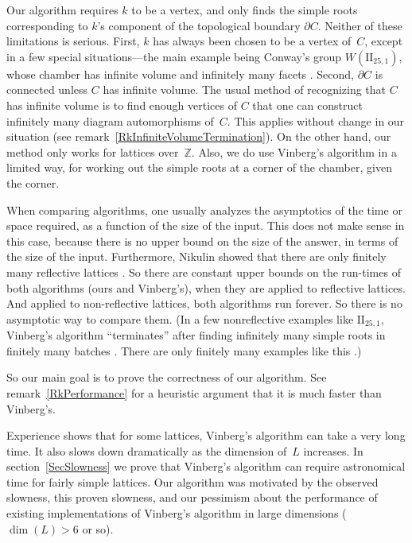 \documentclass[12pt]{amsart}
\def\II{\mathrm{II}}
\def\Z{\mathbb{Z}}
\numberwithin{theorem}{section}
\numberwithin{equation}{section}
\numberwithin{figure}{section}
\theoremstyle{remark}
\begin{document}
Our algorithm requires $k$ to be
a vertex,
and only finds the simple roots corresponding to
$k$'s component of the topological boundary $\partial C$.  
Neither of these limitations is serious.
First, 
$k$ has always been chosen to be a vertex of~$C$,
except in a few special situations---the main example being Conway's group
$W(\II_{25,1})$, whose chamber has infinite volume and infinitely
many facets \cite{Conway}.  Second,
$\partial C$ is connected unless $C$
has infinite volume.   The usual method of recognizing 
that $C$ has infinite volume
is to find enough vertices of $C$ that one
can construct  infinitely many
diagram automorphisms of~$C$.    This 
applies without change in our situation
(see remark~\ref{RkInfiniteVolumeTermination}). 
On the other hand, our method
only works for lattices over~$\Z$.
Also, we do use
Vinberg's algorithm in a limited way, for working out the
simple roots
at a corner of the chamber, given the corner.

When comparing algorithms, one usually analyzes 
the asymptotics of the time or space
required, as a function of the size of the input.  
This does not make sense in this case, because
there is no
upper bound on the size of the answer,
in terms of the size of the input.
Furthermore, Nikulin showed
that there are only
finitely many reflective lattices \cite{NikulinFinitelyMany}\cite{Esselmann}.  So there 
are constant upper bounds on the run-times of both algorithms
(ours and Vinberg's),
when they are applied to reflective lattices.  
And applied to
non-reflective lattices, both algorithms run forever. 
So there is no asymptotic way to compare them.  (In a few
nonreflective
examples like $\II_{25,1}$, Vinberg's algorithm ``terminates''
after finding infinitely many simple roots in finitely many batches \cite{Conway}\cite{BorcherdsLikeTheLeechLattice}.  
There are only finitely many examples like this \cite{NikulinFinitelyManyParabolic}.)

So our main goal is to prove the correctness of our
algorithm.  See remark~\ref{RkPerformance} for a heuristic 
argument that  it is much faster than
Vinberg's. 

Experience shows that for some lattices,
Vinberg's algorithm can take a very long
time.  It also slows down dramatically as
the dimension of~$L$ increases. 
In section~\ref{SecSlowness}
we prove that Vinberg's algorithm can require astronomical
time for fairly simple lattices.  Our
algorithm was motivated by the observed slowness,
this proven slowness,
and our pessimism about the performance of existing
implementations of Vinberg's algorithm in large dimensions ($\dim(L)>6$ or so).
\end{document}
